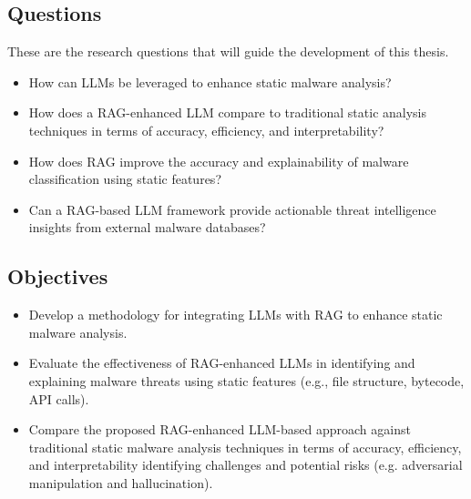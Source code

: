 \subsection{Questions}
These are the research questions that will guide the development of this thesis.
\begin{itemize}
	\item How can LLMs be leveraged to enhance static malware analysis?
	\item How does a RAG-enhanced LLM compare to traditional static analysis techniques in terms of accuracy,
	      efficiency, and interpretability?
	\item How does RAG improve the accuracy and explainability of malware classification using static
	      features?
	\item Can a RAG-based LLM framework provide actionable threat intelligence insights from external malware
	      databases?
\end{itemize}

\subsection{Objectives}
\begin{itemize}
	\item Develop a methodology for integrating LLMs with RAG to enhance static malware analysis.
	\item Evaluate the effectiveness of RAG-enhanced LLMs in identifying and explaining malware threats using
	      static features (e.g., file structure, bytecode, API calls).
	\item Compare the proposed RAG-enhanced LLM-based approach against traditional static malware analysis
	      techniques in terms of accuracy, efficiency, and interpretability identifying challenges and
	      potential risks (e.g. adversarial manipulation and hallucination).
\end{itemize}


